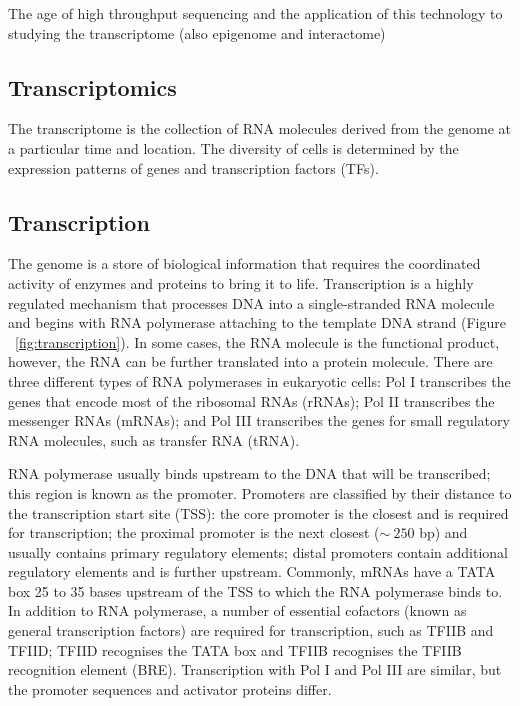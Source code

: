 The age of high throughput sequencing and the application of this technology to studying the transcriptome (also epigenome and interactome)

\subsection{Transcriptomics}

The transcriptome is the collection of RNA molecules derived from the genome at a particular time and location. The diversity of cells is determined by the expression patterns of genes and transcription factors (TFs).

\subsection{Transcription}

The genome is a store of biological information that requires the coordinated activity of enzymes and proteins to bring it to life. Transcription is a highly regulated mechanism that processes DNA into a single-stranded RNA molecule and begins with RNA polymerase attaching to the template DNA strand (Figure ~\ref{fig:transcription}). In some cases, the RNA molecule is the functional product, however, the RNA can be further translated into a protein molecule. There are three different types of RNA polymerases in eukaryotic cells: Pol I transcribes the genes that encode most of the ribosomal RNAs (rRNAs); Pol II transcribes the messenger RNAs (mRNAs); and Pol III transcribes the genes for small regulatory RNA molecules, such as transfer RNA (tRNA).

RNA polymerase usually binds upstream to the DNA that will be transcribed; this region is known as the promoter. Promoters are classified by their distance to the transcription start site (TSS): the core promoter is the closest and is required for transcription; the proximal promoter is the next closest ($\sim~250$ bp) and usually contains primary regulatory elements; distal promoters contain additional regulatory elements and is further upstream. Commonly, mRNAs have a TATA box 25 to 35 bases upstream of the TSS to which the RNA polymerase binds to. In addition to RNA polymerase, a number of essential cofactors (known as general transcription factors) are required for transcription, such as TFIIB and TFIID; TFIID recognises the TATA box and TFIIB recognises the TFIIB recognition element (BRE). Transcription with Pol I and Pol III are similar, but the promoter sequences and activator proteins differ.

